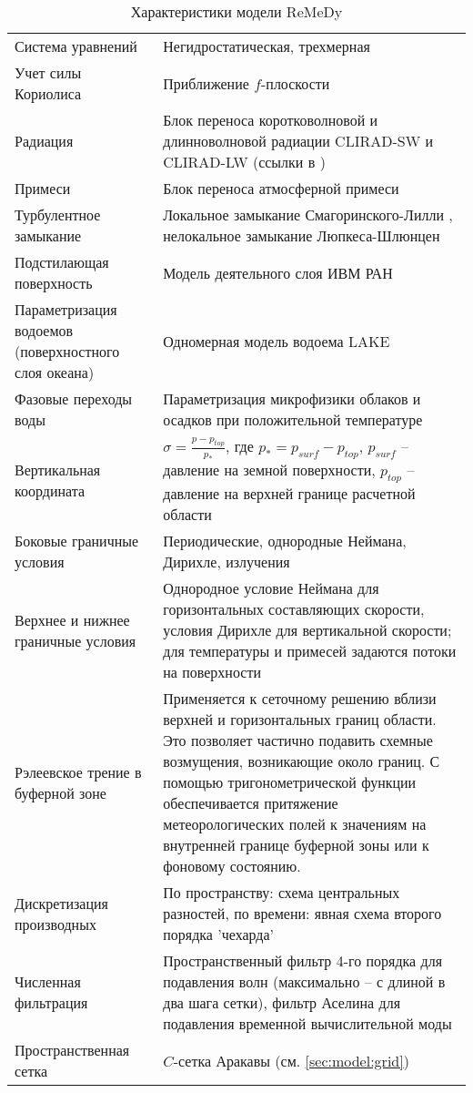 \renewcommand{\arraystretch}{2}
\begin{table}
\centering
\caption{Характеристики модели ReMeDy}
\label{tab:model}
\small
\begin{tabu} to 
\toprule
Система уравнений & Негидростатическая, трехмерная \\
Учет силы Кориолиса & Приближение $f$-плоскости \\
Радиация & Блок переноса коротковолновой и длинноволновой радиации CLIRAD-SW и CLIRAD-LW (ссылки в \citep{StepanenkoMikushin2008})\\
Примеси & Блок переноса атмосферной примеси \citep{StepanenkoMikushin2008} \\
Турбулентное замыкание	& Локальное замыкание Смагоринского-Лилли \citep{Smagorinsky1958,Lilly1962}, нелокальное замыкание Люпкеса-Шлюнцен \citep{LupkesSchluenzen1996,NohEtAl2003} \\
Подстилающая поверхность & Модель деятельного слоя ИВМ РАН \citep{VolodinLykosov1998} \\
Параметризация водоемов (поверхностного слоя океана)	& Одномерная модель водоема LAKE \citep{StepanenkoEtAl2011} \\
Фазовые переходы воды & Параметризация микрофизики облаков и осадков при положительной температуре \citep{TeixeiraMiranda1997}\\
Вертикальная координата & $\sigma=\frac{p-p_{top}}{p_*}$, где $p_*=p_{surf}-p_{top}$, $p_{surf}$ -- давление на земной поверхности, $p_{top}$ -- давление на верхней границе расчетной области \\
Боковые граничные условия & Периодические, однородные Неймана, Дирихле, излучения \\
Верхнее и нижнее граничные условия & Однородное условие Неймана для горизонтальных составляющих скорости, условия Дирихле для вертикальной скорости; для температуры и примесей задаются потоки на поверхности \\
Рэлеевское трение в буферной зоне & Применяется к сеточному решению вблизи верхней и горизонтальных границ области. Это позволяет частично подавить схемные возмущения, возникающие около границ. С помощью тригонометрической функции обеспечивается притяжение метеорологических полей к значениям на внутренней границе буферной зоны или к фоновому состоянию. \\
Дискретизация производных & По пространству: схема центральных разностей, по времени: явная схема второго порядка 'чехарда' \\
Численная фильтрация & Пространственный фильтр 4-го порядка для подавления волн (максимально – с длиной в два шага сетки), фильтр Аселина для подавления временной вычислительной моды \\
Пространственная сетка & $C$-сетка Аракавы (см. \ref{sec:model:grid})\\
\bottomrule
\end{tabu}
\end{table}
\renewcommand{\arraystretch}{1}

